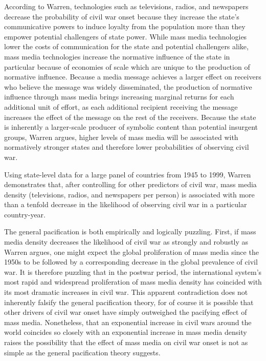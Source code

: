 \documentclass[11pt,article,oneside]{memoir}
\begin{document}
According to Warren, technologies such as televisions, radios, and
newspapers decrease the probability of civil war onset because they
increase the state's communicative powers to induce loyalty from the
population more than they empower potential challengers of state power.
While mass media technologies lower the costs of communication for the
state and potential challengers alike, mass media technologies increase
the normative influence of the state in particular because of economies
of scale which are unique to the production of normative influence.
Because a media message achieves a larger effect on receivers who
believe the message was widely disseminated, the production of normative
influence through mass media brings increasing marginal returns for each
additional unit of effort, as each additional recipient receiving the
message increases the effect of the message on the rest of the
receivers. Because the state is inherently a larger-scale producer of
symbolic content than potential insurgent groups, Warren argues, higher
levels of mass media will be associated with normatively stronger states
and therefore lower probabilities of observing civil war.

Using state-level data for a large panel of countries from 1945 to 1999,
Warren demonstrates that, after controlling for other predictors of
civil war, mass media density (televisions, radios, and newspapers per
person) is associated with more than a tenfold decrease in the
likelihood of observing civil war in a particular country-year.

The general pacification is both empirically and logically puzzling.
First, if mass media density decreases the likelihood of civil war as
strongly and robustly as Warren argues, one might expect the global
proliferation of mass media since the 1950s to be followed by a
corresponding decrease in the global prevalence of civil war. It is
therefore puzzling that in the postwar period, the international
system's most rapid and widespread proliferation of mass media density
has coincided with its most dramatic increases in civil war. This
apparent contradiction does not inherently falsify the general
pacification theory, for of course it is possible that other drivers of
civil war onset have simply outweighed the pacifying effect of mass
media. Nonetheless, that an exponential increase in civil wars around
the world coincides so closely with an exponential increase in mass
media density raises the possibility that the effect of mass media on
civil war onset is not as simple as the general pacification theory
suggests.
\end{document}

